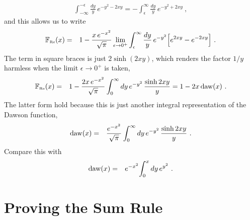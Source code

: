 \documentclass[preprint,12pt,eqsecnum,nofootinbib,amsmath,amssymb]{revtex4}
\newcommand{\smRe}{{\rm\scriptscriptstyle Re}}
\begin{document}
{{{{{{{%
\begin{eqnarray}
  \int_{-\infty}^{-\epsilon} \frac{dy}{y}\, e^{-y^2 - 2 x y} 
  =
  -\int_\epsilon^\infty \frac{dy}{y}\, e^{-y^2 + 2 x y} \ ,
\end{eqnarray}
and this allows us to write 
\begin{eqnarray}
  \mathbb{F}_\smRe(x) 
  &=&
  1 -
  \frac{x\,e^{-x^2}}{\sqrt{\pi}}\lim_{\epsilon\to0^+}
  \int_\epsilon^\infty \frac{dy}{y}\, e^{-y^2}\Big[
  e^{2 x y}  - e^{- 2 x y} 
  \Big] \ .
\end{eqnarray}
The term in square braces is just $2\sinh(2xy)$, which renders
the factor $1/y$ harmless when the limit $\epsilon \to 0^+$ is
taken, 
\begin{eqnarray}
  \mathbb{F}_\smRe(x) 
  &=&
  1 -
  \frac{2x\,e^{-x^2}}{\sqrt{\pi}}  \int_0^\infty dy\, 
  e^{-y^2}\,   \frac{\sinh 2 x y }{y} 
  =
  1 - 2 x\, {\rm daw}(x) \ .
\end{eqnarray}
The latter form hold because this is just another integral
representation of the Dawson function,
\begin{eqnarray}
  {\rm daw}(x)
  &=&
  \frac{e^{-x^2}}{\sqrt{\pi}}  \int_0^\infty dy\, 
  e^{-y^2}\,   \frac{\sinh 2 x y }{y} \ .
\end{eqnarray}
Compare this with
\begin{eqnarray}
  {\rm daw}(x)
  &=&
  e^{-x^2} \! \int_0^x dy\,   e^{y^2} \ .
\end{eqnarray}

\pagebreak
\section{Proving the Sum Rule}
\label{app:sumrule}

}}}}}}}
\end{document}
